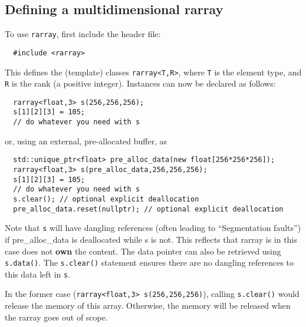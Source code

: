 \documentclass[11pt,twoside]{article}
\begin{document}
\subsection{Defining a multidimensional rarray}
\label{definerarray}

To use \texttt{rarray}, first include the header file:
\begin{framed}\vspace{-14pt}%
\begin{verbatim}
  #include <rarray>
\end{verbatim}%
\vspace{-14pt}
\end{framed}
\noindent
This defines the (template) classes \texttt{rarray{\tt<}T,R{\tt>}}, where
\texttt T is the element type, and \texttt R is the
rank (a positive integer).  Instances can now be
declared as follows:
\begin{framed}\vspace{-18pt}%
\begin{verbatim}
  rarray<float,3> s(256,256,256);
  s[1][2][3] = 105;
  // do whatever you need with s
\end{verbatim}%
\vspace{-14pt}
\end{framed}
\noindent
or, using an external, pre-allocated buffer, as
\begin{framed}\vspace{-18pt}%
\begin{verbatim}
  std::unique_ptr<float> pre_alloc_data(new float[256*256*256]); 
  rarray<float,3> s(pre_alloc_data,256,256,256);
  s[1][2][3] = 105;
  // do whatever you need with s
  s.clear(); // optional explicit deallocation
  pre_alloc_data.reset(nullptr); // optional explicit deallocation
\end{verbatim}%
\vspace{-14pt}
\end{framed}
Note that \texttt{s} will have dangling references (often leading to
``Segmentation faults'') if pre\_alloc\_data is deallocated while s is
not.  This reflects that rarray is in this case does not \textbf{own}
the content. The data pointer can also be retrieved using
\texttt{s.data()}. The \texttt{s.clear()} statement ensures there are
no dangling references to this data left in \texttt{s}. 

In the former case (\texttt{rarray<float,3> s(256,256,256)}), calling
\texttt{s.clear()}  would
release the memory of this array. Otherwise, the memory will be
released when the rarray goes out of scope.
\end{document}
